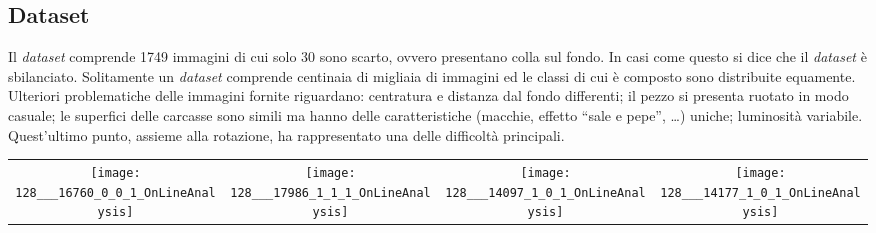 \documentclass[a0,portrait]{a0poster}
\begin{document}
\begin{multicols}{2}
\section*{Dataset}
Il \textit{dataset} comprende 1749 immagini di cui solo 30 sono scarto, ovvero presentano colla sul fondo.
In casi come questo si dice che il \textit{dataset} è sbilanciato.
Solitamente un \textit{dataset} comprende centinaia di migliaia di immagini ed le classi di cui è composto sono distribuite equamente.
Ulteriori problematiche delle immagini fornite riguardano:
centratura e distanza dal fondo differenti;
il pezzo si presenta ruotato in modo casuale;
le superfici delle carcasse sono simili ma hanno delle caratteristiche (macchie, effetto ``sale e pepe'', \dots) uniche;
luminosità variabile.
Quest'ultimo punto, assieme alla rotazione, ha rappresentato una delle difficoltà principali.
\\
\begin{center}
    \begin{tabular}{cccc} \label{griglia_dataset}
      \texttt{[image: 128\_\_\_16760\_0\_0\_1\_OnLineAnalysis]} &
      \texttt{[image: 128\_\_\_17986\_1\_1\_1\_OnLineAnalysis]} &
      \texttt{[image: 128\_\_\_14097\_1\_0\_1\_OnLineAnalysis]} &
      \texttt{[image: 128\_\_\_14177\_1\_0\_1\_OnLineAnalysis]}
    \end{tabular}
\end{center}
  



\end{multicols}
\end{document}
